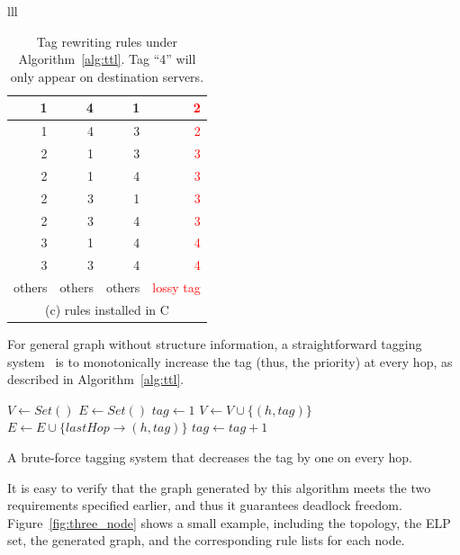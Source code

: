 \begin{table}[t]
{\begin{tabular}{lll}
\begin{tabular}{|r|r|r|r|}
			\hline
			\hline
			1 & 4 & 1 & \textcolor{red}{2} \\
			\hline
			1 & 4 & 3 & \textcolor{red}{2} \\
			\hline
			2 & 1 & 3 & \textcolor{red}{3} \\
			\hline
			2 & 1 & 4 & \textcolor{red}{3} \\
			\hline
			2 & 3 & 1 & \textcolor{red}{3} \\
			\hline
			2 & 3 & 4 & \textcolor{red}{3} \\
			\hline
			3 & 1 & 4 & \textcolor{red}{4} \\
			\hline
			3 & 3 & 4 & \textcolor{red}{4} \\
			\hline
			others & others & others & \textcolor{red}{lossy tag} \\
			\hline
			\multicolumn{4}{c}{(c) rules installed in C} \\
		\end{tabular}
	\end{tabular}
}
	\caption{Tag rewriting rules under Algorithm~\ref{alg:ttl}. Tag ``4'' will only appear on destination servers.}
	\vspace{-2em}
	\label{table:tagging_table}
\end{table}

For general graph without structure information, a straightforward tagging
system~\cite{karol2003prevention} is to monotonically increase the tag (thus,
the priority) at every hop, as described in Algorithm~\ref{alg:ttl}.

\begin{algorithm}[t]
	\small
	$V \gets Set()$\;
	$E \gets Set()$\;
	 {
		$tag \gets 1$\;
		 {
			$V \gets V \cup \{(h, tag)\}$\;
			$E \gets E \cup \{lastHop\rightarrow(h, tag)\}$\;
			$tag \gets tag+1$\;
		}
	}
	\;
    \caption{A brute-force tagging system that decreases the tag by one on every hop.}
	\label{alg:ttl}
\end{algorithm}




It is easy to verify that the graph generated by this algorithm meets the two
requirements specified earlier, and thus it guarantees deadlock freedom.
Figure~\ref{fig:three_node} shows a small example, including the topology, the
ELP set, the generated graph, and the corresponding rule
lists for each node.

